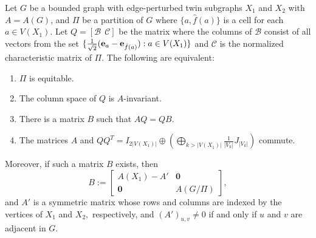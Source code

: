 \documentclass[10pt,a4paper]{amsart}
\def \e {{\bf e}}
\begin{document}
\begin{thm}
\label{godgen}
Let $G$ be a bounded graph with edge-perturbed twin subgraphs $X_1$ and $X_2$ with $A=A(G)$, and $\Pi$ be a partition of $G$ where $\{a,\hat{f}(a)\}$ is a cell for each $a\in V (X_1)$. Let $Q=[\mathcal{B}~~\mathcal{C}]$ be the matrix where the columns of $\mathcal{B}$ consist of all vectors from the set $\{\frac{1}{\sqrt2}(\e_a-\e_{\hat{f}(a)}):a\in V(X_1)\}$ and $\mathcal{C}$ is the normalized characteristic matrix of $\Pi.$ The following are equivalent:
\begin{enumerate}
\item $\Pi$ is equitable.
\item The column space of $Q$ is $A$-invariant.
\item There is a matrix $B$ such that $AQ=QB$.
\item The matrices $A$ and $QQ^T=\displaystyle I_{2|V(X_1)|}\oplus \left(\bigoplus_{k>|V(X_1)|} \frac{1}{|V_k|}J_{|V_k|}\right)$ commute.
\end{enumerate}
Moreover, if such a matrix $B$ exists, then
\begin{equation}
\label{B}
B:=\begin{bmatrix}
     A(X_1)-A' & \mathbf{0}\\
     \mathbf{0} & A(G/\Pi)
     \end{bmatrix},
\end{equation}
and $A'$ is a symmetric matrix whose rows and columns are indexed by the vertices of $X_1$ and $X_2,$ respectively, and $(A')_{u,v}\neq 0$ if and only if $u$ and $v$ are adjacent in $G$.
\end{thm}
\end{document}
